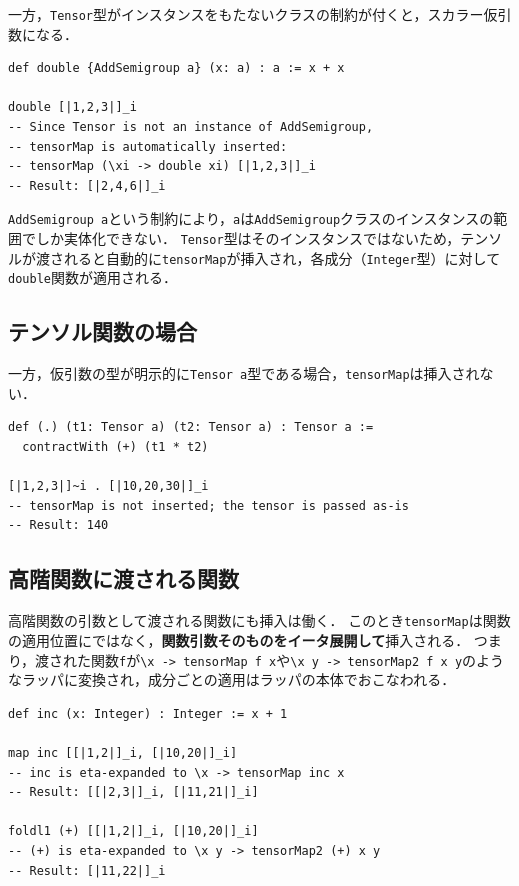 一方，\lstinline{Tensor}型がインスタンスをもたないクラスの制約が付くと，スカラー仮引数になる．
\begin{lstlisting}[language=egison,numbers=none]
def double {AddSemigroup a} (x: a) : a := x + x

double [|1,2,3|]_i
-- Since Tensor is not an instance of AddSemigroup,
-- tensorMap is automatically inserted:
-- tensorMap (\xi -> double xi) [|1,2,3|]_i
-- Result: [|2,4,6|]_i
\end{lstlisting}
\lstinline{AddSemigroup a}という制約により，\lstinline{a}は\lstinline{AddSemigroup}クラスのインスタンスの範囲でしか実体化できない．
\lstinline{Tensor}型はそのインスタンスではないため，テンソルが渡されると自動的に\lstinline{tensorMap}が挿入され，各成分（\lstinline{Integer}型）に対して\lstinline{double}関数が適用される．

\subsection{テンソル関数の場合}

一方，仮引数の型が明示的に\lstinline{Tensor a}型である場合，\lstinline{tensorMap}は挿入されない．
\begin{lstlisting}[language=egison,numbers=none]
def (.) (t1: Tensor a) (t2: Tensor a) : Tensor a :=
  contractWith (+) (t1 * t2)

[|1,2,3|]~i . [|10,20,30|]_i
-- tensorMap is not inserted; the tensor is passed as-is
-- Result: 140
\end{lstlisting}

\subsection{高階関数に渡される関数}\label{tensor-hof}

高階関数の引数として渡される関数にも挿入は働く．
このとき\lstinline{tensorMap}は関数の適用位置にではなく，\textbf{関数引数そのものをイータ展開して}挿入される．
つまり，渡された関数\lstinline{f}が\lstinline{\x -> tensorMap f x}や\lstinline{\x y -> tensorMap2 f x y}のようなラッパに変換され，成分ごとの適用はラッパの本体でおこなわれる．
\begin{lstlisting}[language=egison,numbers=none]
def inc (x: Integer) : Integer := x + 1

map inc [[|1,2|]_i, [|10,20|]_i]
-- inc is eta-expanded to \x -> tensorMap inc x
-- Result: [[|2,3|]_i, [|11,21|]_i]

foldl1 (+) [[|1,2|]_i, [|10,20|]_i]
-- (+) is eta-expanded to \x y -> tensorMap2 (+) x y
-- Result: [|11,22|]_i
\end{lstlisting}

